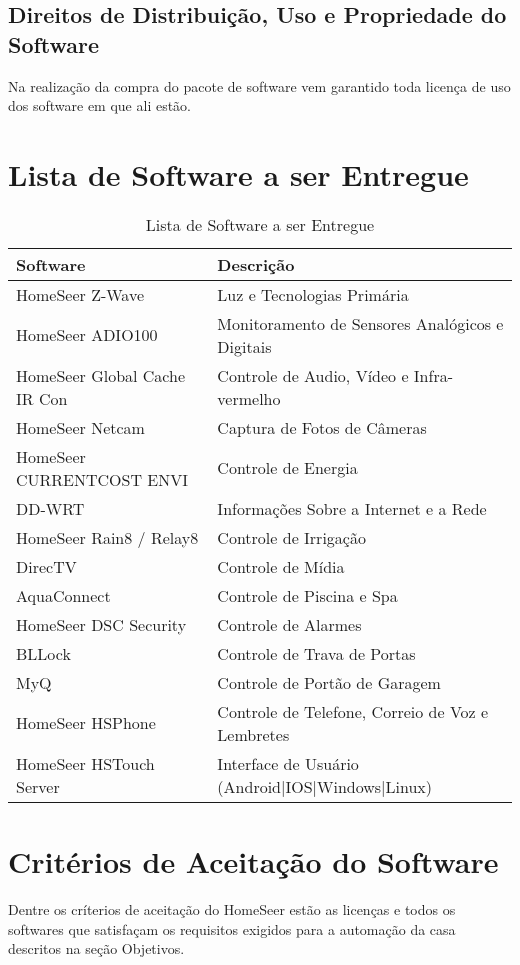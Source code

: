 \subsection{Direitos de Distribuição, Uso e Propriedade do Software}
	Na realização da compra do pacote de software vem garantido toda licença de uso dos software em que ali estão.

\section{Lista de Software a ser Entregue}

\begin{table}[H]
\begin{tabular}{|l|l|}
	\hline
	\textbf{Software} & \textbf{Descrição}\tabularnewline
	\hline
	\hline
	HomeSeer Z-Wave & Luz e Tecnologias Primária\tabularnewline
	\hline
	HomeSeer ADIO100 & Monitoramento de Sensores Analógicos e Digitais\tabularnewline
	\hline
	HomeSeer Global Cache IR Con & Controle de Audio, Vídeo e Infra-vermelho\tabularnewline
	\hline
	HomeSeer Netcam & Captura de Fotos de Câmeras\tabularnewline
	\hline
	HomeSeer CURRENTCOST ENVI & Controle de Energia\tabularnewline
	\hline
	DD-WRT & Informações Sobre a Internet e a Rede\tabularnewline
	\hline
	HomeSeer Rain8 / Relay8 & Controle de Irrigação\tabularnewline
	\hline
	DirecTV & Controle de Mídia\tabularnewline
	\hline
	AquaConnect & Controle de Piscina e Spa\tabularnewline
	\hline
	HomeSeer DSC Security & Controle de Alarmes\tabularnewline
	\hline
	BLLock & Controle de Trava de Portas\tabularnewline
	\hline
	MyQ & Controle de Portão de Garagem\tabularnewline
	\hline
	HomeSeer HSPhone & Controle de Telefone, Correio de Voz e Lembretes\tabularnewline
	\hline
	HomeSeer HSTouch Server & Interface de Usuário (Android|IOS|Windows|Linux)\tabularnewline
	\hline
\end{tabular}
\caption{Lista de Software a ser Entregue}
\label{Lista_de_Software_a_ser_Entregue}
\end{table}

\section{Critérios de Aceitação do Software}
	Dentre os críterios de aceitação do HomeSeer estão as licenças e todos os softwares que satisfaçam os requisitos
	exigidos para a automação da casa descritos na seção Objetivos.
